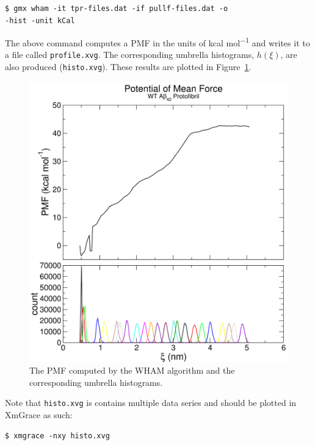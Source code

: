 \documentclass[9pt,tutorial]{livecoms}
\begin{document}
\begin{verbatim}
$ gmx wham -it tpr-files.dat -if pullf-files.dat -o 
-hist -unit kCal
\end{verbatim}

The above command computes a PMF in the units of kcal mol\textsuperscript{$-$1} and writes it to a file called \texttt{profile.xvg}. The corresponding umbrella histograms, $h(\xi)$, are also produced (\texttt{histo.xvg}). These results are plotted in Figure~\ref{umbrella_composite_pmf_histo_fig}.

\begin{figure}[h!]
\centering
\includegraphics{umbrella_composite_pmf_histo}
\caption{The PMF computed by the WHAM algorithm and the corresponding umbrella histograms.}
\label{umbrella_composite_pmf_histo_fig}
\end{figure}

Note that \texttt{histo.xvg} is contains multiple data series and should be plotted in XmGrace as such:

\begin{verbatim}
$ xmgrace -nxy histo.xvg
\end{verbatim}
\end{document}
